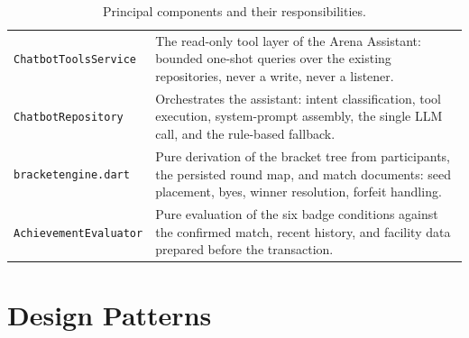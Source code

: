\documentclass{configurations/polimi3i_thesis}
\renewcommand{\_}{\textunderscore\allowbreak}
\begin{document}
\begin{table}[H]
\begin{tabularx}{\textwidth}{l X}
        \texttt{ChatbotToolsService} & The read-only tool layer of the Arena Assistant: bounded one-shot queries over the existing repositories, never a write, never a listener. \\[3px]
        \texttt{ChatbotRepository} & Orchestrates the assistant: intent classification, tool execution, system-prompt assembly, the single LLM call, and the rule-based fallback. \\[3px]
        \texttt{bracket\_engine.dart} & Pure derivation of the bracket tree from participants, the persisted round map, and match documents: seed placement, byes, winner resolution, forfeit handling. \\[3px]
        \texttt{AchievementEvaluator} & Pure evaluation of the six badge conditions against the confirmed match, recent history, and facility data prepared before the transaction. \\[3px]
    \end{tabularx}
    \caption{Principal components and their responsibilities.}
    \label{tab:components}
\end{table}

\section{Design Patterns}
\label{sec:design_patterns}
\end{document}
